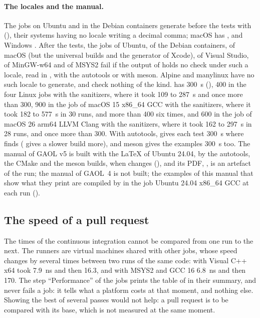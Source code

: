 \paragraph{The locales and the manual.} The jobs on Ubuntu and in the Debian
containers generate  before the tests with
 (), their systems
having no locale writing a decimal comma; macOS has , and
Windows . After the tests, the jobs of Ubuntu, of the Debian containers, of macOS (but the universal builds and the generator of Xcode), of Visual Studio, of MinGW-w64 and of MSYS2 fail if the output of  holds no check under such a locale,
read in ,  with
the autotools or  with meson.\newinvfive{}
Alpine and manylinux have no such locale to generate, and check nothing of
the kind.  has 300~s (), 400 in
the four Linux jobs with the sanitizers, where it took 109 to 287~s and once more
than 300, 900 in the job of macOS 15 x86\_64 GCC with the sanitizers,
where it took 182 to 577~s in 30 runs, and more than 400 six times, and 600
in the job of macOS 26 arm64 LLVM Clang with the sanitizers, where it took
162 to 297~s in 28 runs, and once more than 300. With autotools, 
gives each test 300~s where  finds 
( gives a slower build more), and
meson gives the examples 300~s too.\newinvfive{} The manual of GAOL v5 is
built with the LaTeX of Ubuntu 24.04, by the autotools, the CMake and the
meson builds, when  changes (), and its PDF,
, is an artefact of the run; the manual of
GAOL~4 is not built; the examples of this manual that show what they
print are compiled by  in the job Ubuntu
24.04 x86\_64 GCC at each run ().

\subsection{The speed of a pull request}\label{sec:ci-speed}

The times of the continuous integration cannot be compared from one run to
the next. The runners are virtual machines shared with other jobs, whose
speed changes by several times between two runs of the same code:
 with Visual C++ x64 took 7.9~ns and then 16.3, and 
with MSYS2 and GCC 16 6.8~ns and then 170. The step ``Performance'' of the
jobs prints the table of  in their summary, and
never fails a job: it tells what a platform costs at that moment, and
nothing else. Showing the best of several passes would not help: a pull
request is to be compared with its base, which is not measured at the same
moment.

